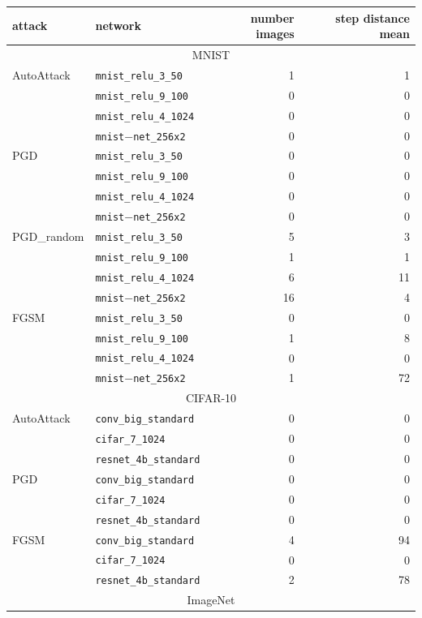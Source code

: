 \begin{tabularx}{\textwidth}{Xlrr}
\toprule
attack & network & number images & step distance mean \\
\midrule
\multicolumn{4}{c}{MNIST} \\
\midrule
AutoAttack & \texttt{mnist\_relu\_3\_50} & 1 & 1 \\
 & \texttt{mnist\_relu\_9\_100} & 0 & 0 \\
 & \texttt{mnist\_relu\_4\_1024} & 0 & 0 \\
 & \texttt{mnist$-$net\_256x2} & 0 & 0 \\
PGD & \texttt{mnist\_relu\_3\_50} & 0 & 0 \\
 & \texttt{mnist\_relu\_9\_100} & 0 & 0 \\
 & \texttt{mnist\_relu\_4\_1024} & 0 & 0 \\
 & \texttt{mnist$-$net\_256x2} & 0 & 0 \\
PGD\_random & \texttt{mnist\_relu\_3\_50} & 5 & 3 \\
 & \texttt{mnist\_relu\_9\_100} & 1 & 1 \\
 & \texttt{mnist\_relu\_4\_1024} & 6 & 11 \\
 & \texttt{mnist$-$net\_256x2} & 16 & 4 \\
FGSM & \texttt{mnist\_relu\_3\_50} & 0 & 0 \\
 & \texttt{mnist\_relu\_9\_100} & 1 & 8 \\
 & \texttt{mnist\_relu\_4\_1024} & 0 & 0 \\
 & \texttt{mnist$-$net\_256x2} & 1 & 72 \\
\midrule
\multicolumn{4}{c}{CIFAR-10} \\
\midrule
AutoAttack & \texttt{conv\_big\_standard} & 0 & 0 \\
 & \texttt{cifar\_7\_1024} & 0 & 0 \\
 & \texttt{resnet\_4b\_standard} & 0 & 0 \\
PGD & \texttt{conv\_big\_standard} & 0 & 0 \\
 & \texttt{cifar\_7\_1024} & 0 & 0 \\
 & \texttt{resnet\_4b\_standard} & 0 & 0 \\
FGSM & \texttt{conv\_big\_standard} & 4 & 94 \\
 & \texttt{cifar\_7\_1024} & 0 & 0 \\
 & \texttt{resnet\_4b\_standard} & 2 & 78 \\
\midrule
\multicolumn{4}{c}{ImageNet} \\

\end{tabularx}
